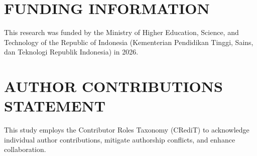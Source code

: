 \documentclass{iaesarticle}
\begin{document}
\section*{FUNDING INFORMATION}
\label{sec:funding}
This research was funded by the Ministry of Higher Education, Science, and Technology of the Republic of Indonesia (Kementerian Pendidikan Tinggi, Sains, dan Teknologi Republik Indonesia) in 2026.

\section*{AUTHOR CONTRIBUTIONS STATEMENT}
\label{sec:credit}
This study employs the Contributor Roles Taxonomy (CRediT) to acknowledge individual author contributions, mitigate authorship conflicts, and enhance collaboration.
\end{document}
